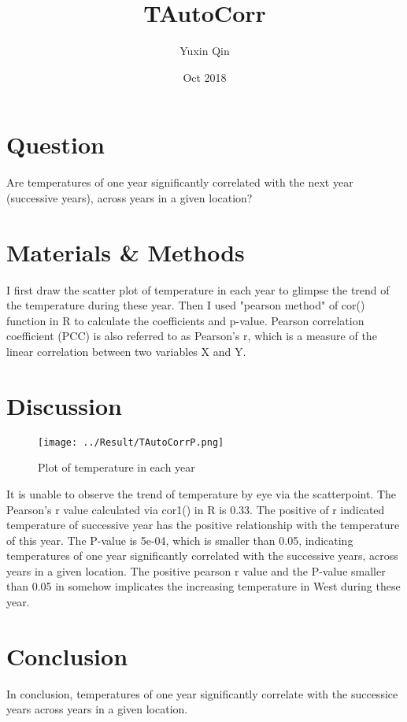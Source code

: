 \documentclass[12pt]{article}
\title{TAutoCorr}
\author{Yuxin Qin}
\date{Oct 2018}
\begin{document}
  \maketitle

  \section{Question}
    Are temperatures of one year significantly correlated with the next year (successive years), across years in a given location?

  \section{Materials \& Methods}
    I first draw the scatter plot of temperature in each year to glimpse the trend of the temperature during these year.
    Then I used "pearson method" of cor() function in R to calculate the coefficients and p-value. Pearson correlation coefficient (PCC) is also referred to as Pearson's r, which is a measure of the linear correlation between two variables X and Y. 

  \section{Discussion}
  \begin{figure}
	\centering
	\texttt{[image: ../Result/TAutoCorrP.png]}
	\caption{Plot of temperature in each year}
  \end{figure}
    
    It is unable to observe the trend of temperature by eye via the scatterpoint. 
    The Pearson's r value calculated via cor1() in R is 0.33. The positive of r indicated temperature of successive year has the positive relationship with the temperature of this year. 
    The P-value is 5e-04, which is smaller than 0.05, indicating temperatures of one year significantly correlated with the successive years, across years in a given location.
    The positive pearson r value and the P-value smaller than 0.05 in somehow implicates the increasing temperature in West during these year.

  \section{Conclusion}
    In conclusion, temperatures of one year significantly correlate with the successice years across years in a given location. 
  
\end{document}
